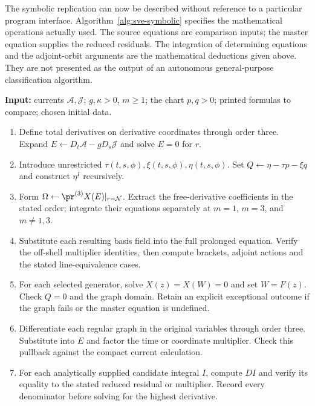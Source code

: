 The symbolic replication can now be described without reference to a
particular program interface. Algorithm~\ref{alg:sve-symbolic} specifies
the mathematical operations actually used. The source equations are
comparison inputs; the master equation supplies the reduced residuals.
The integration of determining equations and the adjoint-orbit arguments
are the mathematical deductions given above. They are not presented as
the output of an autonomous general-purpose classification algorithm.
\par\noindent\begin{minipage}{\linewidth}
\begin{algorithm}
\label{alg:sve-symbolic}
\normalfont\small
\textbf{Input:} currents $\mathcal A,\mathcal J$; $g,\kappa>0$, $m\geq1$;
the chart $p,q>0$; printed formulas to compare; chosen initial data.
\begin{enumerate}
\item Define total derivatives on derivative coordinates through order three.
      Expand $E\gets D_t\mathcal A-gD_s\mathcal J$ and solve $E=0$ for $r$.
\item Introduce unrestricted $\tau(t,s,\phi),\xi(t,s,\phi),\eta(t,s,\phi)$.
      Set $Q\gets\eta-\tau p-\xi q$ and construct $\eta^I$ recursively.
\item Form $\Omega\gets\pr^{(3)}X(E)|_{r=\mathcal N}$.
      Extract the free-derivative coefficients in the stated order;
      integrate their equations separately at $m=1$, $m=3$, and $m\ne1,3$.
\item Substitute each resulting basis field into the full prolonged equation.
      Verify the off-shell multiplier identities, then compute brackets,
      adjoint actions and the stated line-equivalence cases.
\item For each selected generator, solve $X(z)=X(W)=0$ and set $W=F(z)$.
      Check $Q=0$ and the graph domain. Retain an explicit exceptional outcome
      if the graph fails or the master equation is undefined.
\item Differentiate each regular graph in the original variables through
      order three. Substitute into $E$ and factor the time or coordinate
      multiplier. Check this pullback against the compact current calculation.
\item For each analytically supplied candidate integral $I$, compute $DI$ and
      verify its equality to the stated reduced residual or multiplier.
      Record every denominator before solving for the highest derivative.

\end{enumerate}
\end{algorithm}
\end{minipage}
